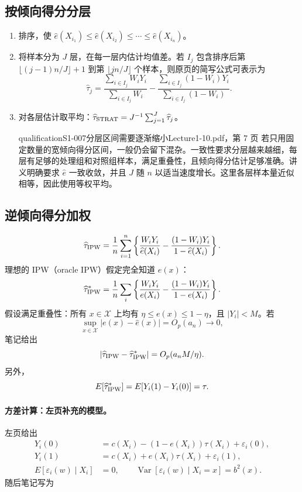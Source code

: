 \subsection{按倾向得分分层}
\begin{enumerate}
\item 排序，使 $\widehat e(X_{i_1})\leq\widehat e(X_{i_2})\leq\cdots\leq\widehat e(X_{i_n})$。
\item 将样本分为 $J$ 层，在每一层内估计均值差。若 $I_j$ 包含排序后第 $\lfloor(j-1)n/J\rfloor+1$ 到第 $\lfloor jn/J\rfloor$ 个样本，则原页的简写公式可表示为
\[
\widehat\tau_j=\frac{\sum_{i\in I_j}W_iY_i}{\sum_{i\in I_j}W_i}
-\frac{\sum_{i\in I_j}(1-W_i)Y_i}{\sum_{i\in I_j}(1-W_i)}.
\]
\item 对各层估计取平均：$\widehat\tau_{\rm STRAT}=J^{-1}\sum_{j=1}^J\widehat\tau_j$。
\begin{reviewnote}{qualification}{S1-007}{分层区间需要逐渐缩小}{Lecture1-10.pdf，第 7 页}
若只用固定数量的宽倾向得分区间，一般仍会留下混杂。一致性要求分层越来越细，每层有足够的处理组和对照组样本，满足重叠性，且倾向得分估计足够准确。讲义明确要求 $\widehat e$ 一致收敛，并且 $J$ 随 $n$ 以适当速度增长。这里各层样本量近似相等，因此使用等权平均。
\end{reviewnote}

\end{enumerate}
\subsection{逆倾向得分加权}
\[
\widehat\tau_{\rm IPW}=\frac1n\sum_{i=1}^n
\left\{\frac{W_iY_i}{\widehat e(X_i)}-\frac{(1-W_i)Y_i}{1-\widehat e(X_i)}\right\}.
\]
理想的 IPW（oracle IPW）假定完全知道 $e(x)$：
\[
\widehat\tau^*_{\rm IPW}=\frac1n\sum_i
\left\{\frac{W_iY_i}{e(X_i)}-\frac{(1-W_i)Y_i}{1-e(X_i)}\right\}.
\]
假设满足重叠性：所有 $x\in\mathcal X$ 上均有 $\eta\leq e(x)\leq1-\eta$，且 $|Y_i|<M$。若
\[
\sup_{x\in\mathcal X}|e(x)-\widehat e(x)|=O_p(a_n)\longrightarrow0,
\]
笔记给出
\[
|\widehat\tau_{\rm IPW}-\widehat\tau^*_{\rm IPW}|=O_p(a_nM/\eta).
\]
另外，
\[
E[\widehat\tau^*_{\rm IPW}]=E[Y_i(1)-Y_i(0)]=\tau.
\]
\paragraph{方差计算：左页补充的模型。}
左页给出
\begin{align*}
Y_i(0)&=c(X_i)-(1-e(X_i))\tau(X_i)+\varepsilon_i(0),\\
Y_i(1)&=c(X_i)+e(X_i)\tau(X_i)+\varepsilon_i(1),\\
E[\varepsilon_i(w)\mid X_i]&=0,\qquad
\operatorname{Var}[\varepsilon_i(w)\mid X_i=x]=b^2(x).
\end{align*}
随后笔记写为

